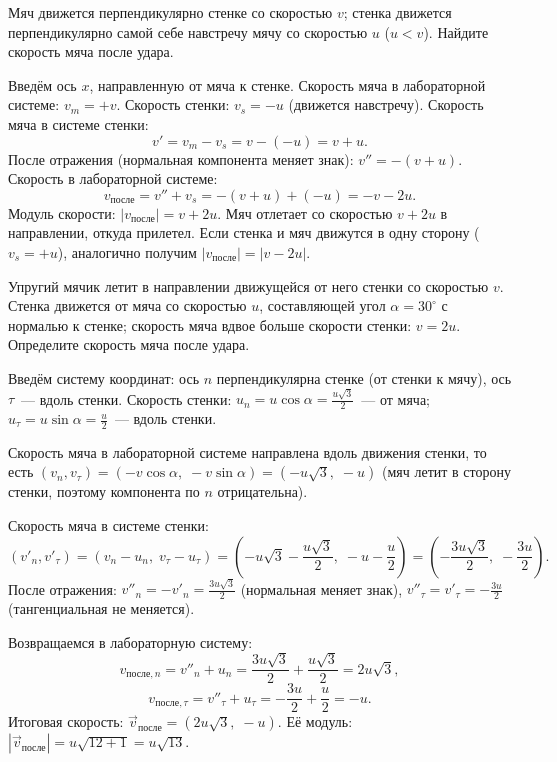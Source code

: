 \documentclass[../main.tex]{subfiles}
\begin{document}
\begin{example}
Мяч движется перпендикулярно стенке со скоростью $v$;
стенка движется перпендикулярно самой себе навстречу мячу
со скоростью $u$ ($u < v$).
Найдите скорость мяча после удара.

Введём ось $x$, направленную от мяча к стенке.
Скорость мяча в лабораторной системе: $v_m = +v$.
Скорость стенки: $v_s = -u$ (движется навстречу).
Скорость мяча в системе стенки: 
\[
    v' = v_m - v_s = v - (-u) = v + u.
\]
После отражения (нормальная компонента меняет знак):
$v'' = -(v + u)$.
Скорость в лабораторной системе:
\[
    v_{\text{после}} = v'' + v_s = -(v+u) + (-u) = -v - 2u.
\]
Модуль скорости: $|v_{\text{после}}| = v + 2u$.
Мяч отлетает со скоростью $v + 2u$ в направлении, откуда прилетел.
Если стенка и мяч движутся в одну сторону ($v_s = +u$), аналогично
получим $|v_{\text{после}}| = |v - 2u|$.
\end{example}

\begin{example}
Упругий мячик летит в направлении движущейся от него стенки
со скоростью $v$. Стенка движется от мяча со скоростью $u$,
составляющей угол $\alpha = 30^\circ$ с нормалью к стенке; скорость
мяча вдвое больше скорости стенки: $v = 2u$.
Определите скорость мяча после удара.

Введём систему координат: ось $n$ перпендикулярна стенке
(от стенки к мячу), ось $\tau$~--- вдоль стенки.
Скорость стенки: $u_n = u\cos\alpha = \frac{u\sqrt{3}}{2}$~--- от мяча;
$u_\tau = u\sin\alpha = \frac{u}{2}$~--- вдоль стенки.

Скорость мяча в лабораторной системе направлена вдоль движения стенки,
то есть $(v_n, v_\tau) = (-v\cos\alpha,\; -v\sin\alpha) = (-u\sqrt{3},\; -u)$
(мяч летит в сторону стенки, поэтому компонента по $n$ отрицательна).

Скорость мяча в системе стенки:
\[
    (v'_n, v'_\tau) = (v_n - u_n,\; v_\tau - u_\tau) 
                    = \left(-u\sqrt{3} - \frac{u\sqrt{3}}{2},\; -u - \frac{u}{2}\right) 
                    = \left(-\frac{3u\sqrt{3}}{2},\; -\frac{3u}{2}\right).
\]
После отражения: $v''_n = -v'_n = \frac{3u\sqrt{3}}{2}$ (нормальная меняет знак),
$v''_\tau = v'_\tau = -\frac{3u}{2}$ (тангенциальная не меняется).

Возвращаемся в лабораторную систему:
\[
    v_{\text{после},n} = v''_n + u_n = \frac{3u\sqrt{3}}{2} + \frac{u\sqrt{3}}{2} = 2u\sqrt{3},
\]
\[
    v_{\text{после},\tau} = v''_\tau + u_\tau = -\frac{3u}{2} + \frac{u}{2} = -u.
\]
Итоговая скорость: $\vec{v}_{\text{после}} = (2u\sqrt{3},\; -u)$.
Её модуль: $|\vec{v}_{\text{после}}| = u\sqrt{12 + 1} = u\sqrt{13}$.
\end{example}
\end{document}
